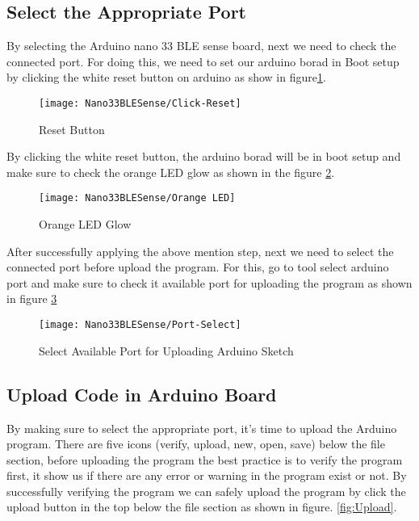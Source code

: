 \subsection{Select the Appropriate Port}

By selecting the Arduino nano 33 BLE sense board, next we need to check the connected port. For doing this, we need to set our arduino borad in Boot setup by clicking the white reset button on arduino as show in figure\ref{fig:Check-Reset}.

\begin{figure}[h]
	\centering
	\texttt{[image: Nano33BLESense/Click-Reset]}
	\caption{Reset Button}
	\label{fig:Check-Reset}
\end{figure}

By clicking the white reset button, the arduino borad will be in boot setup and make sure to check the orange LED glow as shown in the figure \ref{fig:LED-Glow}.

\begin{figure}[h]
	\centering
	\texttt{[image: Nano33BLESense/Orange LED]}
	\caption{Orange LED Glow}
	\label{fig:LED-Glow}
\end{figure}

After successfully applying the above mention step, next we need to select the connected port before upload the program. For this, go to tool select arduino port and make sure to check it available port for uploading the program as shown in figure \ref{fig:Port-Selection}

\begin{figure}[h]
	\centering
	\texttt{[image: Nano33BLESense/Port-Select]}
	\caption{Select Available Port for Uploading Arduino Sketch}
	\label{fig:Port-Selection}
\end{figure}

\subsection{Upload Code in Arduino Board}

By making sure to select the appropriate port, it's time to upload the Arduino program. There are five icons (verify, upload, new, open, save) below the file section, before uploading the program the best practice is to verify the program first, it show us if there are any error or warning in the program exist or not. By successfully verifying the program we can safely upload the program by click the upload button in the top below the file section as shown in figure. \ref{fig:Upload}.


